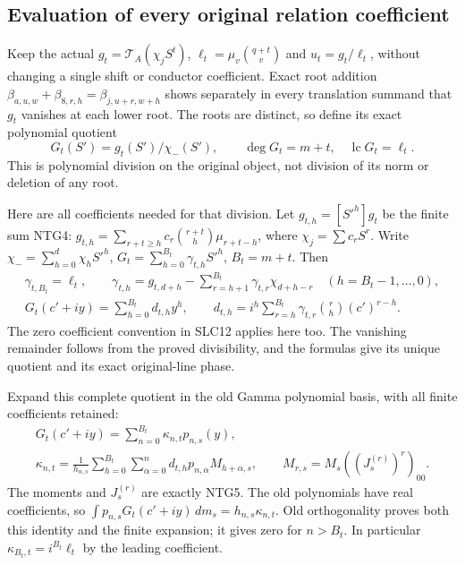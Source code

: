 \documentclass[11pt,a4paper]{article}
\begin{document}
\subsection{Evaluation of every original relation coefficient}
Keep the actual $g_t=\mathcal T_A(\chi_jS^t)$,
$\ell_t=\mu_v\binom{q+t}{v}$ and $u_t=g_t/\ell_t$,
without changing a single shift or conductor coefficient.
Exact root addition
$\beta_{a,u,w}+\beta_{8,r,h}=\beta_{j,u+r,w+h}$
shows separately in every translation summand that
$g_t$ vanishes at each lower root. The roots are distinct,
so define its exact polynomial quotient
\[
        G_t(S')=g_t(S')/\chi_-(S'),\qquad
        \deg G_t=m+t,\quad\operatorname{lc}G_t=\ell_t .
                                                               \tag{SLC13}
\]
This is polynomial division on the original object, not
division of its norm or deletion of any root.

Here are all coefficients needed for that division.
Let $g_{t,h}=[S'^h]g_t$ be the finite sum NTG4:
$g_{t,h}=\sum_{r+t\ge h}c_r\binom{r+t}{h}\mu_{r+t-h}$,
where $\chi_j=\sum c_rS^r$.
Write $\chi_-=\sum_{h=0}^{d}\chi_hS'^h$,
$G_t=\sum_{h=0}^{B_t}\gamma_{t,h}S'^h$, $B_t=m+t$.
Then
\[
\begin{gathered}
 \gamma_{t,B_t}=\ell_t,\qquad
 \gamma_{t,h}=g_{t,d+h}
       -\sum_{r=h+1}^{B_t}\gamma_{t,r}\chi_{d+h-r}
                   \quad(h=B_t-1,\ldots,0),\\
 G_t(c'+iy)=\sum_{h=0}^{B_t}d_{t,h}y^h,\qquad
 d_{t,h}=i^h\sum_{r=h}^{B_t}
                \gamma_{t,r}\binom rh(c')^{r-h}.
\end{gathered}                                                    \tag{SLC14}
\]
The zero coefficient convention in SLC12 applies here too.
The vanishing remainder follows from the proved divisibility,
and the formulas give its unique quotient and its exact
original-line phase.

Expand this complete quotient in the old Gamma polynomial
basis, with all finite coefficients retained:
\[
\begin{gathered}
 G_t(c'+iy)=\sum_{n=0}^{B_t}\kappa_{n,t}p_{n,s}(y),\\
 \kappa_{n,t}=\frac{1}{h_{n,s}}
       \sum_{h=0}^{B_t}\sum_{\alpha=0}^{n}
              d_{t,h}p_{n,\alpha}M_{h+\alpha,s},
 \qquad M_{r,s}=M_s((J_s^{(r)})^r)_{00}.
\end{gathered}                                                    \tag{SLC15}
\]
The moments and $J_s^{(r)}$ are exactly NTG5.
The old polynomials have real coefficients, so
$\int p_{n,s}G_t(c'+iy)\,dm_s=h_{n,s}\kappa_{n,t}$.
Old orthogonality proves both this identity and the
finite expansion; it gives zero for $n>B_t$.
In particular $\kappa_{B_t,t}=i^{B_t}\ell_t$ by
the leading coefficient.
\end{document}
